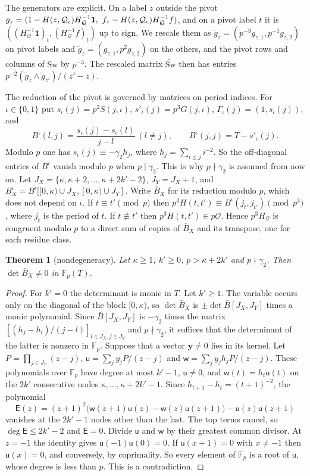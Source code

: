 \documentclass[11pt]{amsart}
\newtheorem{theorem}{Theorem}[section]
\theoremstyle{definition}
\theoremstyle{remark}
\numberwithin{equation}{section}
\newcommand{\F}{\mathbb F}
\newcommand{\cO}{\mathcal O}
\begin{document}
The generators are explicit. On a label $z$ outside the pivot
$g_z=(1-H(z,\mathcal Q_{\rm c})H_{\mathcal Q}^{-1}\mathbf 1,\ f_z-H(z,\mathcal Q_{\rm c})
H_{\mathcal Q}^{-1}f)$, and on a pivot label $t$ it is $((H_{\mathcal Q}^{-1}\mathbf 1)_t,
(H_{\mathcal Q}^{-1}f)_t)$ up to sign. We rescale them as $\tilde g_z=(p^{-3}g_{z,1},p^{-1}g_{z,2})$ on pivot
labels and $\tilde g_z=(g_{z,1},p^2g_{z,2})$ on the others, and the pivot rows and columns of $\mathrm{Sw}$ by $p^{-3}$.
The rescaled matrix $\widetilde{\mathrm{Sw}}$ then has entries $p^{-2}(\tilde g_z\wedge\tilde g_{z'})/(z'-z)$.

The reduction of the pivot is governed by matrices on period indices. For $\iota\in\{0,1\}$ put
$s_\iota(j)=p^2S(j,\iota)$, $s'_\iota(j)=p^3G(j,\iota)$,
$\Gamma_\iota(j)=(1,s_\iota(j))$, and
\[
 B^\iota(l,j)=\frac{s_\iota(j)-s_\iota(l)}{j-l}\ (l\ne j),\qquad
 B^\iota(j,j)=T-s'_\iota(j).
\]
Modulo $p$ one has $s_\iota(j)\equiv-\gamma_2h_j$, where $h_j=\sum_{i\le j}i^{-2}$. So the
off-diagonal entries of $B^\iota$ vanish modulo $p$ when $p\mid\gamma_2$. This is why $p\nmid\gamma_2$ is
assumed from now on. Let $J_X=\{\kappa,\kappa+2,\dots,\kappa+2k'-2\}$, $J_Y=J_X+1$, and
$B_X^\iota=B^\iota[[0,\kappa)\cup J_X,[0,\kappa)\cup J_Y]$. Write $\bar B_X$ for its reduction
modulo $p$, which does not depend on $\iota$. If $t\equiv t'\pmod p$ then
$p^3H(t,t')\equiv B^\iota(j_t,j_{t'})\pmod{p^3}$, where $j_t$ is the period of $t$. If
$t\not\equiv t'$ then $p^3H(t,t')\in p\cO$. Hence $p^3H_{\mathcal Q}$ is congruent modulo $p$ to a
direct sum of copies of $\bar B_X$ and its transpose, one for each residue class.

\begin{theorem}[nondegeneracy]\label{thm:nd}
Let $\kappa\ge1$, $k'\ge0$, $p>\kappa+2k'$ and $p\nmid\gamma_2$. Then $\det\bar B_X\ne0$ in $\F_p(T)$.
\end{theorem}
\begin{proof}
For $k'=0$ the determinant is monic in $T$. Let $k'\ge1$. The variable occurs only on the diagonal of the block
$[0,\kappa)$, so $\det\bar B_X$ is $\pm\det\bar B[J_X,J_Y]$ times a monic polynomial. Since
$\bar B[J_X,J_Y]$ is $-\gamma_2$ times the matrix $[(h_j-h_l)/(j-l)]_{l\in J_X,j\in J_Y}$ and
$p\nmid\gamma_2$, it suffices that the determinant of the latter is nonzero in $\F_p$. Suppose that a vector
$\mathbf y\ne0$ lies in its kernel. Let $P=\prod_{j\in J_Y}(z-j)$, $\mathsf u=\sum_jy_jP/(z-j)$ and
$\mathsf w=\sum_jy_jh_jP/(z-j)$. These polynomials over $\F_p$ have degree at most $k'-1$,
$\mathsf u\ne0$, and $\mathsf w(t)=h_t\mathsf u(t)$ on the $2k'$ consecutive nodes $\kappa,\dots,\kappa+2k'-1$. Since
$h_{t+1}-h_t=(t+1)^{-2}$, the polynomial
\[
 \mathsf E(z)=(z+1)^2\bigl(\mathsf w(z+1)\mathsf u(z)-\mathsf w(z)\mathsf u(z+1)\bigr)-\mathsf u(z)\mathsf u(z+1)
\]
vanishes at the $2k'-1$ nodes other than the last. The top terms cancel, so $\deg\mathsf E\le2k'-2$ and $\mathsf E=0$.
Divide $\mathsf u$ and $\mathsf w$ by their greatest common divisor. At $z=-1$ the identity gives
$\mathsf u(-1)\mathsf u(0)=0$. If $\mathsf u(x+1)=0$ with $x\ne-1$ then $\mathsf u(x)=0$, and conversely, by
coprimality.
So every element of $\F_p$ is a root of $\mathsf u$, whose degree is less than $p$. This is a contradiction.
\end{proof}
\end{document}
